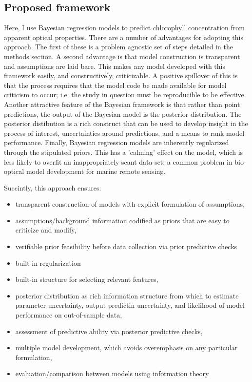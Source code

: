 \documentclass[10pt]{article}
\begin{document}
	\subsection{Proposed framework}
	    Here, I use  Bayesian regression models to predict chlorophyll concentration from apparent optical properties. There are a number of advantages for adopting this approach. The first of these is a problem agnostic set of steps detailed in the methods section. A second advantage is that model construction is transparent and assumptions are laid bare. This makes any model developed with this framework easily, and constructively, criticizable. A positive spillover of this is that the process requires that the model code be made available for model criticism to occur; i.e. the study in question must be reproducible to be effective. Another attractive feature of the Bayesian framework is that rather than point predictions, the output of the Bayesian model is the posterior distribution. The posterior distibution is a rich construct that can be used to develop insight in the process of interest, uncertainties around predictions, and a means to rank model performance. Finally, Bayesian regression models are inherently regularized through the stipulated priors. This has a 'calming' effect on the model, which is less likely to overfit an inappropriately scant data set; a common problem in bio-optical model development for marine remote sensing. 


Succintly, this approach ensures:
	\begin{itemize}
		\item transparent construction of models with explicit formulation of assumptions,
		\item assumptions/background information codified as priors that are easy to criticize and modify,
		\item verifiable prior feasibility before data collection via prior predictive checks
		\item built-in regularization
		\item built-in structure for selecting relevant features,
		\item posterior distribution as rich information structure from which to estimate parameter uncertainty, output predictin uncertainty, and likelihood of model performance on out-of-sample data,
		\item assessment of predictive ability via posterior predictive checks,
		\item multiple model development, which avoids overemphasis on any particular formulation,
		\item evaluation/comparison between models using information theory
	\end{itemize}
\end{document}
